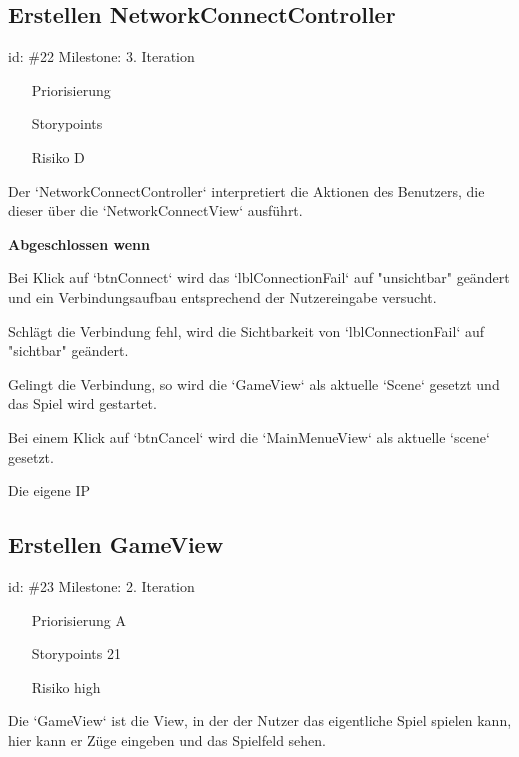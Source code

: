 \subsection*{Erstellen NetworkConnectController}
id: \#22 Milestone: 3. Iteration\\

\begin{itemize}
\item[Priorisierung] 
\item[Storypoints] 
\item[Risiko] D
\end{itemize}

Der `NetworkConnectController` interpretiert die Aktionen des Benutzers, die dieser über die `NetworkConnectView` ausführt.

\textbf{Abgeschlossen wenn}
\begin{todolist}
    \item[\done]  Bei Klick auf `btnConnect` wird das `lblConnectionFail` auf "unsichtbar" geändert und ein Verbindungsaufbau entsprechend der Nutzereingabe versucht.
  \item[\done]  Schlägt die Verbindung fehl, wird die Sichtbarkeit von `lblConnectionFail` auf "sichtbar" geändert.
  \item[\done]  Gelingt die Verbindung, so wird die `GameView` als aktuelle `Scene` gesetzt und das Spiel wird gestartet.
  \item[\done]  Bei einem Klick auf `btnCancel` wird die `MainMenueView` als aktuelle `scene` gesetzt.
  \item[\done]  Die eigene IP

\end{todolist}


\subsection*{Erstellen GameView}
id: \#23 Milestone: 2. Iteration\\

\begin{itemize}
\item[Priorisierung] A
\item[Storypoints] 21
\item[Risiko] high
\end{itemize}

Die `GameView` ist die View, in der der Nutzer das eigentliche Spiel spielen kann, hier kann er Züge eingeben und das Spielfeld sehen.

